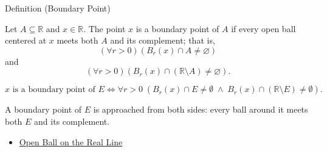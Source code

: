 \begin{definitionbox}{Definition (Boundary Point)}
\begin{definition}
\label{def:boundary-point}
Let $A\subseteq\mathbb{R}$ and $x\in\mathbb{R}$.  The point $x$ is a
boundary point of $A$ if every open ball centered at $x$ meets both $A$ and
its complement; that is,
\[
  (\forall r>0)(B_r(x)\cap A\neq\varnothing)
\]
and
\[
  (\forall r>0)(B_r(x)\cap(\mathbb{R}\setminus A)\neq\varnothing).
\]
\end{definition}
\end{definitionbox}
\begin{remark*}
\[
x \text{ is a boundary point of } E \Longleftrightarrow \forall r>0\;(B_{r}(x)\cap E\neq\emptyset \;\land\; B_{r}(x)\cap(\mathbb{R}\setminus E)\neq\emptyset).
\]
\end{remark*}
\begin{remark*}[Interpretation]
A boundary point of $E$ is approached from both sides: every ball around it meets both $E$ and its complement.
\end{remark*}
\begin{dependencies}
\begin{itemize}
  \item \hyperref[def:open-ball]{Open Ball on the Real Line}
\end{itemize}
\end{dependencies}
